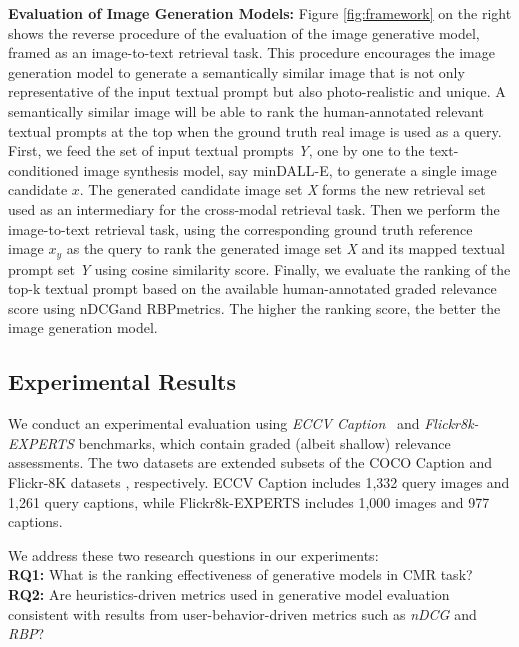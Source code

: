\noindent\textbf{Evaluation of Image Generation Models:}
Figure \ref{fig:framework} on the right shows the reverse procedure of the evaluation of the image generative model, framed as an image-to-text retrieval task. This procedure encourages the image generation model to generate a semantically similar image that is not only representative of the input textual prompt but also photo-realistic and unique. A semantically similar image will be able to rank the human-annotated relevant textual prompts at the top when the ground truth real image is used as a query. First, we feed the set of input textual prompts \textit{Y}, one by one to the text-conditioned image synthesis model, say minDALL-E, to generate a single image candidate $x$. The generated candidate image set \textit{X} forms the new retrieval set used as an intermediary for the cross-modal retrieval task. Then we perform the image-to-text retrieval task, using the corresponding ground truth reference image $x_y$ as the query to rank the generated image set \textit{X} and its mapped textual prompt set \textit{Y} using cosine similarity score. Finally, we evaluate the ranking of the top-k textual prompt based on the available human-annotated graded relevance score using nDCG\textquotesingle@K and RBP\textquotesingle@K metrics. The higher the ranking score, the better the image generation model.

\subsection{Experimental Results}
We conduct an experimental evaluation using \textit{ECCV Caption}~\cite{ECCV} and \textit{Flickr8k-EXPERTS} benchmarks, which contain graded (albeit shallow) relevance assessments. The two datasets are extended subsets of the COCO Caption \cite{Lin2014MicrosoftCC} and Flickr-8K datasets \cite{flickr8k}, respectively. ECCV Caption includes 1,332 query images and 1,261 query captions, while Flickr8k-EXPERTS includes 1,000 images and 977 captions. 

We address these two research questions in our experiments:\\
\textbf{RQ1:} What is the ranking effectiveness of generative models in CMR task? \\
\textbf{RQ2:} Are heuristics-driven metrics used in generative model evaluation consistent with results from user-behavior-driven metrics such as \textit{nDCG\textquotesingle@K} and \textit{RBP\textquotesingle@K}? 

